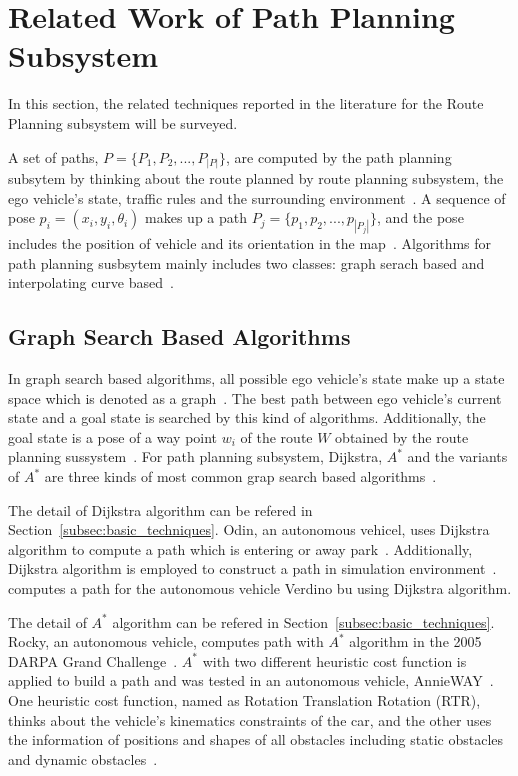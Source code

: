\documentclass[conference]{IEEEtran}
\begin{document}
\section{Related Work of Path Planning Subsystem}\label{sec:path_planner}
In this section, the related techniques reported in the literature for the Route Planning subsystem will be surveyed.

A set of paths, $P=\{P_1, P_2,..., P_{|P|}\}$, are computed by the path planning subsytem by thinking about the route planned by route planning subsystem, the ego vehicle's state, traffic rules and the surrounding environment~\cite{self_driving}. A sequence of pose $p_i=(x_i, y_i, \theta_i)$ makes up a path $P_j=\{p_1, p_2, ..., p_{|P_j|}\}$, and the pose includes the position of vehicle and its orientation in the map~\cite{self_driving}. Algorithms for path planning susbsytem mainly includes two classes: graph serach based and interpolating curve based~\cite{self_driving}.

\subsection{Graph Search Based Algorithms}
In graph search based algorithms, all possible ego vehicle's state make up a state space which is denoted as a graph~\cite{gonzalez2015review}. The best path between ego vehicle's current state and a goal state is searched by this kind of algorithms. Additionally, the goal state is a pose of a way point $w_i$ of the route $W$ obtained by the route planning sussystem~\cite{gonzalez2015review}. For path planning subsystem, Dijkstra, $A^*$ and the variants of $A^*$ are three kinds of most common grap search based algorithms~\cite{self_driving}.

The detail of Dijkstra algorithm can be refered in Section~\ref{subsec:basic_techniques}. Odin, an autonomous vehicel, uses Dijkstra algorithm to compute a path which is entering or away park~\cite{bacha2008odin}. Additionally, Dijkstra algorithm is employed to construct a path in simulation environment~\cite{kala2013multi}. \cite{arnay2016safe} computes a path for the autonomous vehicle Verdino bu using Dijkstra algorithm.

The detail of $A^*$ algorithm can be refered in Section~\ref{subsec:basic_techniques}. Rocky, an autonomous vehicle, computes path with $A^*$ algorithm in the 2005 DARPA Grand Challenge~\cite{Leedy2007}. $A^*$ with two different heuristic cost function is applied to build a path and was tested in an autonomous vehicle, AnnieWAY~\cite{Ziegler2008787}. One heuristic cost function, named as Rotation Translation Rotation (RTR), thinks about the vehicle's kinematics constraints of the car, and the other uses the information of positions and shapes of all obstacles including static obstacles and dynamic obstacles~\cite{Ziegler2008787}.
\end{document}
